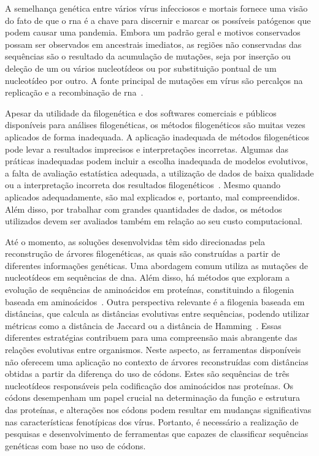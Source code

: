 A semelhança genética entre vários vírus infecciosos e mortais fornece uma visão do fato de que o \gls{rna} é a chave para discernir e marcar os possíveis patógenos que podem causar uma pandemia. Embora um padrão geral e motivos conservados possam ser observados em ancestrais imediatos, as regiões não conservadas das sequências são o resultado da acumulação de mutações, seja por inserção ou deleção de um ou vários nucleotídeos ou por substituição pontual de um nucleotídeo por outro. A fonte principal de mutações em vírus são percalços na replicação e a recombinação de \gls{rna}~\cite{behl_threat_2022}.

Apesar da utilidade da filogenética e dos softwares comerciais e públicos disponíveis para análises filogenéticas, os métodos filogenéticos são muitas vezes aplicados de forma inadequada. A aplicação inadequada de métodos filogenéticos pode levar a resultados imprecisos e interpretações incorretas. Algumas das práticas inadequadas podem incluir a escolha inadequada de modelos evolutivos, a falta de avaliação estatística adequada, a utilização de dados de baixa qualidade ou a interpretação incorreta dos resultados filogenéticos~\cite{felsenstein_inferring_2004,mrbayes_huelsenbeck_2001}. Mesmo quando aplicados adequadamente, são mal explicados e, portanto, mal compreendidos.~\cite[p. 1]{barry_phylogenetic_analysis_2006} Além disso, por trabalhar com grandes quantidades de dados, os métodos utilizados devem ser avaliados também em relação ao seu custo computacional.


Até o momento, as soluções desenvolvidas têm sido direcionadas pela reconstrução de árvores filogenéticas, as quais são construídas a partir de diferentes informações genéticas. Uma abordagem comum utiliza as mutações de nucleotídeos em sequências de \gls{dna}. Além disso, há métodos que exploram a evolução de sequências de aminoácidos em proteínas, constituindo a filogenia baseada em aminoácidos~\cite{protein_le_2008}. Outra perspectiva relevante é a filogenia baseada em distâncias, que calcula as distâncias evolutivas entre sequências, podendo utilizar métricas como a distância de Jaccard ou a distância de Hamming~\cite{sokal_statistical_method_1958}. Essas diferentes estratégias contribuem para uma compreensão mais abrangente das relações evolutivas entre organismos. Neste aspecto, as ferramentas disponíveis não oferecem uma aplicação no contexto de árvores reconstruídas com distâncias obtidas a partir da diferença do uso de códons. Estes são sequências de três nucleotídeos responsáveis pela codificação dos aminoácidos nas proteínas. Os códons desempenham um papel crucial na determinação da função e estrutura das proteínas, e alterações nos códons podem resultar em mudanças significativas nas características fenotípicas dos vírus. Portanto, é necessário a realização de pesquisas e desenvolvimento de ferramentas que capazes de classificar sequências genéticas com base no uso de códons.

